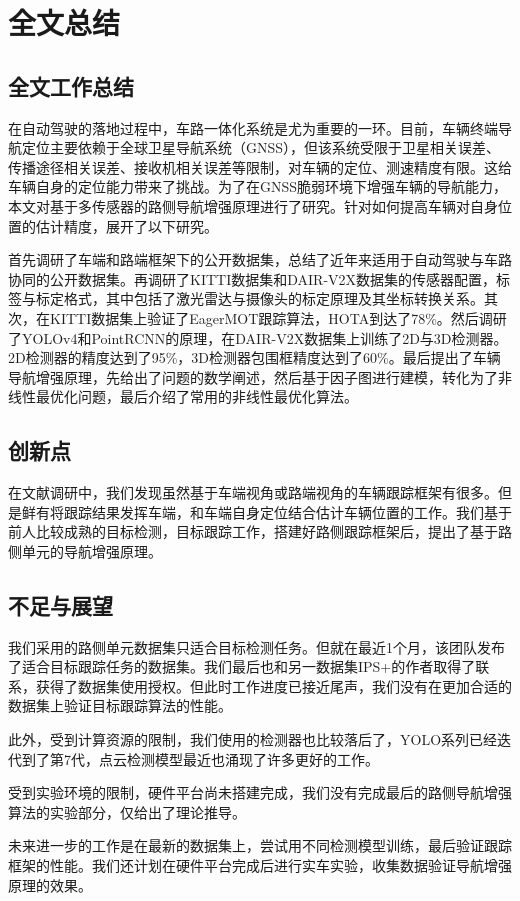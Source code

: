 \newpage
{}
\section{全文总结}
\subsection{全文工作总结}
在自动驾驶的落地过程中，车路一体化系统是尤为重要的一环。目前，车辆终端导航定位主要依赖于全球卫星导航系统（GNSS），但该系统受限于卫星相关误差、传播途径相关误差、接收机相关误差等限制，对车辆的定位、测速精度有限。这给车辆自身的定位能力带来了挑战。为了在GNSS脆弱环境下增强车辆的导航能力，本文对基于多传感器的路侧导航增强原理进行了研究。针对如何提高车辆对自身位置的估计精度，展开了以下研究。

首先调研了车端和路端框架下的公开数据集，总结了近年来适用于自动驾驶与车路协同的公开数据集。再调研了KITTI数据集和DAIR-V2X数据集的传感器配置，标签与标定格式，其中包括了激光雷达与摄像头的标定原理及其坐标转换关系。其次，在KITTI数据集上验证了EagerMOT跟踪算法，HOTA到达了78\%。然后调研了YOLOv4和PointRCNN的原理，在DAIR-V2X数据集上训练了2D与3D检测器。2D检测器的精度达到了95\%，3D检测器包围框精度达到了60\%。最后提出了车辆导航增强原理，先给出了问题的数学阐述，然后基于因子图进行建模，转化为了非线性最优化问题，最后介绍了常用的非线性最优化算法。

\subsection{创新点}

在文献调研中，我们发现虽然基于车端视角或路端视角的车辆跟踪框架有很多。但是鲜有将跟踪结果发挥车端，和车端自身定位结合估计车辆位置的工作。我们基于前人比较成熟的目标检测，目标跟踪工作，搭建好路侧跟踪框架后，提出了基于路侧单元的导航增强原理。

\subsection{不足与展望}

我们采用的路侧单元数据集只适合目标检测任务。但就在最近1个月，该团队发布了适合目标跟踪任务的数据集。我们最后也和另一数据集IPS+的作者取得了联系，获得了数据集使用授权。但此时工作进度已接近尾声，我们没有在更加合适的数据集上验证目标跟踪算法的性能。

此外，受到计算资源的限制，我们使用的检测器也比较落后了，YOLO系列已经迭代到了第7代，点云检测模型最近也涌现了许多更好的工作。

受到实验环境的限制，硬件平台尚未搭建完成，我们没有完成最后的路侧导航增强算法的实验部分，仅给出了理论推导。

未来进一步的工作是在最新的数据集上，尝试用不同检测模型训练，最后验证跟踪框架的性能。我们还计划在硬件平台完成后进行实车实验，收集数据验证导航增强原理的效果。
